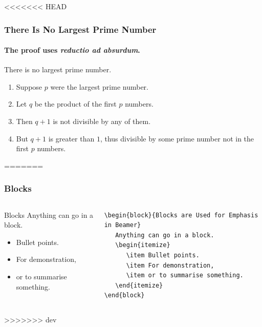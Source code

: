 \documentclass[aspectratio=169]{beamer}
\begin{document}
<<<<<<< HEAD
\begin{frame} 
\frametitle{There Is No Largest Prime Number} 
\framesubtitle{The proof uses \textit{reductio ad absurdum}.} 
\begin{theorem}
There is no largest prime number. \end{theorem} 
\begin{enumerate} 
\item<1-| alert@1> Suppose $p$ were the largest prime number. 
\item<2-> Let $q$ be the product of the first $p$ numbers. 
\item<3-> Then $q+1$ is not divisible by any of them. 
\item<1-> But $q + 1$ is greater than $1$, thus divisible by some prime
number not in the first $p$ numbers.
\end{enumerate}
=======

\begin{frame}[fragile]
\frametitle{Blocks}
   \begin{columns}
      \begin{column}{0.48\textwidth}
         \begin{block}{Blocks}
            Anything can go in a block.
            \begin{itemize}
               \item Bullet points.
               \item For demonstration,
               \item or to summarise something.
            \end{itemize}
         \end{block}
      \end{column}
      \begin{column}{0.48\textwidth}
         \footnotesize
         \begin{verbatim}
\begin{block}{Blocks are Used for Emphasis in Beamer}
   Anything can go in a block.
   \begin{itemize}
      \item Bullet points.
      \item For demonstration,
      \item or to summarise something.
   \end{itemize}
\end{block}
         \end{verbatim}
      \end{column}
   \end{columns}
>>>>>>> dev
\end{frame}



\end{frame}
\end{document}

